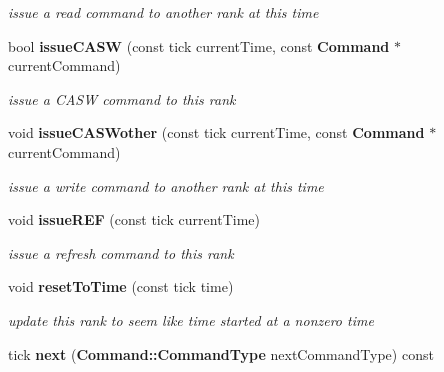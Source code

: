 \begin{DoxyCompactItemize}
\begin{DoxyCompactList}\small\item\em issue a read command to another rank at this time \item\end{DoxyCompactList}\item 
bool {\bf issueCASW} (const tick currentTime, const {\bf Command} $\ast$currentCommand)\label{class_d_r_a_msim_i_i_1_1_rank_a15e78ee5c48538d717134278a7cc8cd4}

\begin{DoxyCompactList}\small\item\em issue a CASW command to this rank \item\end{DoxyCompactList}\item 
void {\bf issueCASWother} (const tick currentTime, const {\bf Command} $\ast$currentCommand)\label{class_d_r_a_msim_i_i_1_1_rank_a89bd002a9f75ea2638acb9ced38a4249}

\begin{DoxyCompactList}\small\item\em issue a write command to another rank at this time \item\end{DoxyCompactList}\item 
void {\bf issueREF} (const tick currentTime)\label{class_d_r_a_msim_i_i_1_1_rank_a60bd1d77cbcdb576c9069f8a85355bfd}

\begin{DoxyCompactList}\small\item\em issue a refresh command to this rank \item\end{DoxyCompactList}\item 
void {\bf resetToTime} (const tick time)
\begin{DoxyCompactList}\small\item\em update this rank to seem like time started at a nonzero time \item\end{DoxyCompactList}\item 
tick {\bf next} ({\bf Command::CommandType} nextCommandType) const \label{class_d_r_a_msim_i_i_1_1_rank_a6b32d7bde7506fce22151d4d9fbfc404}


\end{DoxyCompactItemize}

